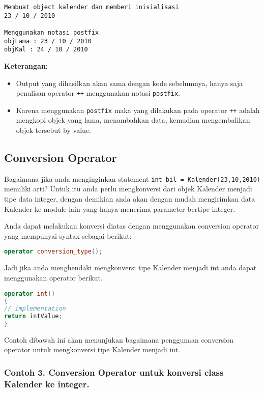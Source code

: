 \begin{verbatim}
Membuat object kalender dan memberi inisialisasi
23 / 10 / 2010

Menggunakan notasi postfix
objLama : 23 / 10 / 2010
objKal : 24 / 10 / 2010
\end{verbatim}

\textbf{Keterangan:}

\begin{itemize}
\tightlist
\item
  Output yang dihasilkan akan sama dengan kode sebelumnya, hanya saja
  penulisan operator \texttt{++} menggunakan notasi \texttt{postfix}.
\item
  Karena menggunakan \texttt{postfix} maka yang dilakukan pada operator
  \texttt{++} adalah mengkopi objek yang lama, menambahkan data,
  kemudian mengembalikan objek tersebut by value.
\end{itemize}

\subsection{Conversion Operator}\label{conversion-operator}

Bagaimana jika anda menginginkan statement
\texttt{int\ bil\ =\ Kalender(23,10,2010)} memiliki arti? Untuk itu anda
perlu mengkonversi dari objek Kalender menjadi tipe data integer, dengan
demikian anda akan dengan mudah mengirimkan data Kalender ke module lain
yang hanya menerima parameter bertipe integer.

Anda dapat melakukan konversi diatas dengan menggunakan conversion
operator yang mempunyai syntax sebagai berikut:

\begin{lstlisting}[language=c++]
operator conversion_type();
\end{lstlisting}

Jadi jika anda menghendaki mengkonversi tipe Kalender menjadi int anda
dapat menggunakan operator berikut.

\begin{lstlisting}[language=c++]
operator int()
{
// implementation
return intValue;
}
\end{lstlisting}

Contoh dibawah ini akan menunjukan bagaimana penggunaan conversion
operator untuk mengkonversi tipe Kalender menjadi int.

\subsubsection*{Contoh 3. Conversion Operator untuk konversi class Kalender ke integer.}

